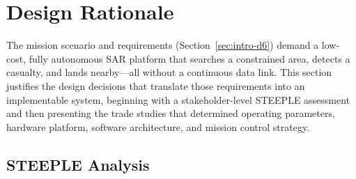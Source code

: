 
\section{Design Rationale}\label{sec:rationale}

The mission scenario and requirements (Section~\ref{sec:intro-d6}) demand a low-cost, fully autonomous SAR platform that searches a constrained area, detects a casualty, and lands nearby---all without a continuous data link. This section justifies the design decisions that translate those requirements into an implementable system, beginning with a stakeholder-level STEEPLE assessment and then presenting the trade studies that determined operating parameters, hardware platform, software architecture, and mission control strategy.

\subsection{STEEPLE Analysis}\label{sec:steeple}

